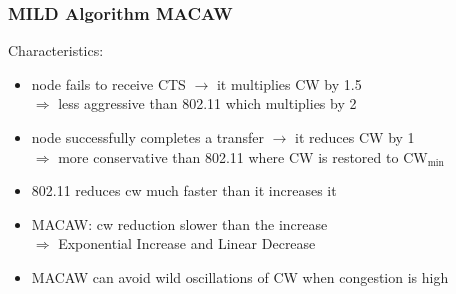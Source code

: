 \subsubsection{MILD Algorithm MACAW}
Characteristics:
\begin{itemize}
    \item node fails to receive CTS $\rightarrow$ it multiplies CW by 1.5\\
    $\Rightarrow$ less aggressive than 802.11 which multiplies by 2
    \item node successfully completes a transfer $\rightarrow$
    it reduces CW by 1\\ $\Rightarrow$ more conservative than 802.11
    where CW is restored to $\text{CW}_\text{min}$
    \item 802.11 reduces cw much faster than it increases it
    \item MACAW: cw reduction slower than the increase\\
    $\Rightarrow$ Exponential Increase and Linear Decrease
    \item  MACAW can avoid wild oscillations of CW when congestion is high
\end{itemize}

